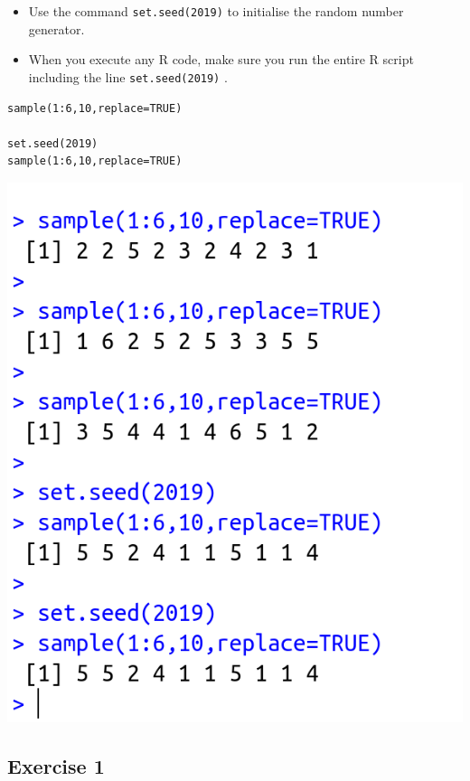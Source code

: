 \documentclass[a4paper,12pt]{article}
\begin{document}
\Large 

\begin{itemize}
    \item Use the command \texttt{set.seed(2019)} to initialise the random number generator.

    \item When you execute any R code, make sure you run the entire R script including the line \texttt{set.seed(2019)} .
\end{itemize}
\begin{framed}\begin{verbatim}
sample(1:6,10,replace=TRUE)

set.seed(2019)
sample(1:6,10,replace=TRUE)
\end{verbatim}\end{framed}
\newpage 
\begin{center}
\includegraphics[scale=0.5]{00-C1/images/00-C1-Q3-Setseed.png}    
\end{center}


\newpage 

\subsection*{Exercise 1}
\end{document}
